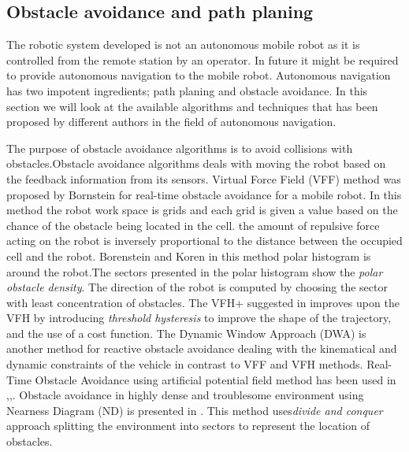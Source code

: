 \subsection{Obstacle avoidance and path planing}

The robotic system developed is not an autonomous mobile robot as it is controlled from the remote station by an operator. In future it might be required to provide autonomous navigation to the mobile robot. Autonomous navigation has two impotent ingredients; path planing and obstacle avoidance. In this section we will look at the available algorithms and techniques that has been proposed by different authors in the field of autonomous navigation. 

The purpose of obstacle avoidance algorithms is to avoid collisions with obstacles.Obstacle avoidance algorithms deals with moving the robot based on the feedback information from its sensors. Virtual Force Field (VFF) method was proposed by Bornstein \cite{borenstein1989real} for  real-time obstacle avoidance for a mobile robot. In this method the robot work space is grids and each grid is given a value based on the chance of  the obstacle being  located in the cell. the amount of repulsive force acting on the robot is inversely proportional to the distance between the occupied cell and the robot. Borenstein and Koren \cite{borenstein1991vector} in this method polar histogram is around the robot.The sectors presented in the polar histogram show the \textit{polar obstacle density}. The direction of the robot is computed by choosing the sector with least concentration of obstacles. The VFH+ suggested in \cite{ulrich1998vfh+} improves upon the VFH  by introducing  \textit{threshold hysteresis} to improve the shape of the trajectory, and the use of a cost function. The Dynamic Window Approach (DWA) \cite{brock1999high} is another method for reactive obstacle avoidance dealing with the kinematical and dynamic constraints of the vehicle in contrast to VFF and VFH methods. Real-Time Obstacle Avoidance  using artificial potential field method has been used in \cite{khatib1986real},\cite{tang2010novel},\cite{park2001obstacle}. Obstacle avoidance in highly dense and troublesome environment using Nearness Diagram (ND) is presented in \cite{minguez2004nearness}. This method uses\textit{divide and conquer} approach splitting the environment into sectors to represent the location of obstacles. 


